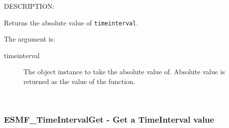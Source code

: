 {\sf DESCRIPTION:\\ }


       Returns the absolute value of {\tt timeinterval}.
  
       The argument is:
       \begin{description}
       \item[timeinterval]
            The object instance to take the absolute value of.
            Absolute value is returned as the value of the function.
       \end{description}
   
 
\mbox{}\hrulefill\ 
 
\subsubsection [ESMF\_TimeIntervalGet] {ESMF\_TimeIntervalGet - Get a TimeInterval value }


